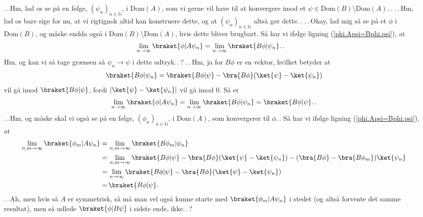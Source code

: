 \documentclass{report}
\begin{document}
.\,.\,Hm, lad os se på en følge, $(\psi_n)_{n\in\mathbb N}$, i Dom$(A)$, som vi gerne vil have til at konvergere imod et $\psi \in \mathrm{Dom}(B) \setminus \mathrm{Dom}(A)$.\,. .\,.\,Hm, lad os bare sige for nu, at vi rigtignok altid kan konstruere dette, og at $(\psi_n)_{n\in\mathbb N}$ altså gør dette.\,. .\,.\,Okay, lad mig så se på et $\phi$ i $\mathrm{Dom}(B)$, og måske endda også i $\mathrm{Dom}(B) \setminus \mathrm{Dom}(A)$, hvis dette bliver brugbart. Så har vi ifølge ligning (\ref{phi.Apsi=Bphi.psi}), at
\begin{align}
\begin{aligned}
	\lim_{n\to \infty} \braket{\phi| A \psi_n} =&\, 
		\lim_{n\to \infty}\braket{B \phi| \psi_n}.\,.
\end{aligned}
\end{align}
Hm, og kan vi så tage grænsen så $\psi_n\to\psi$ i dette udtryk.\,.\,? .\,.\,Hm, ja for $B\phi$ er en vektor, hvilket betyder at 
\begin{align}
\begin{aligned}
	\braket{B \phi| \psi_n} = \braket{B \phi| \psi} - \bra{B \phi}(\ket{\psi} - \ket{\psi_n})
\end{aligned}
\end{align}
vil gå imod $\braket{B \phi| \psi}$, fordi $|\ket{\psi} - \ket{\psi_n}|$ vil gå imod 0. Så er
\begin{align}
\begin{aligned}
	\lim_{n\to \infty} \braket{\phi| A \psi_n} =
	\lim_{n\to \infty}\braket{B \phi| \psi_n} = \braket{B \phi| \psi}.\,.
\end{aligned}
\end{align}
.\,.\,Hm, og måske skal vi også se på en følge, $(\phi_n)_{n\in\mathbb N}$, i Dom$(A)$, som konvergerer til $\phi$.\,. Så har vi ifølge ligning (\ref{phi.Apsi=Bphi.psi}), at
\begin{align}
\begin{aligned}
	\lim_{n,m\to \infty} \braket{\phi_m| A \psi_n} 
		=&\,
		\lim_{n,m\to \infty}\braket{B \phi_m| \psi_n} \\
		=&\, \lim_{n,m\to \infty} \braket{B \phi| \psi} 
			- \bra{B \phi}(\ket{\psi} - \ket{\psi_n}) 
			- (\bra{B \phi} - \bra{B \phi_m})\ket{\psi_n} \\
		=&\, \lim_{n\to \infty} \braket{B \phi| \psi} 
			- \bra{B \phi}(\ket{\psi} - \ket{\psi_n}) \\
		=&\, \braket{B \phi| \psi}.
\end{aligned}
\end{align}
.\,.\,Ah, men hvis så $A$ er symmetrisk, så må man vel også kunne starte med $\braket{\phi_m| A \psi_n} $ i stedet (og altså forvente det samme resultat), men så udlede $\braket{\phi|B \psi}$ i sidste ende, ikke.\,.\,?
\end{document}
